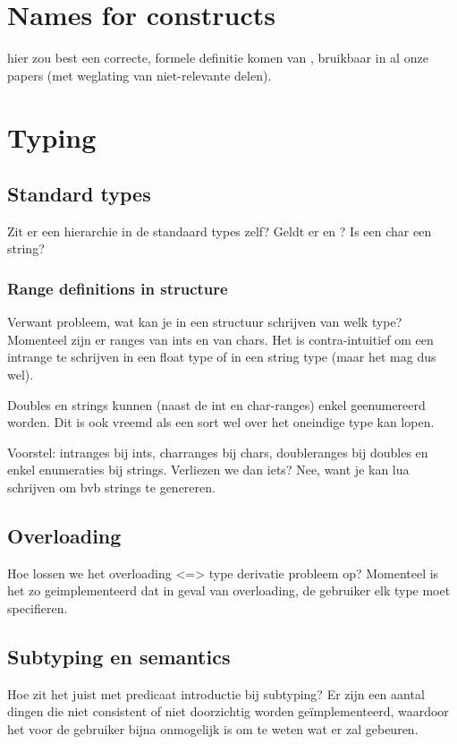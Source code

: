 \documentclass{article}
\begin{document}
\section{Names for \fodot constructs}
hier zou best een correcte, formele definitie komen van \fodot, bruikbaar in al onze papers (met weglating van niet-relevante delen).


\section{Typing}

\subsection{Standard types}
Zit er een hierarchie in de standaard types zelf? Geldt er  en ? Is een char een string?

\subsubsection{Range definitions in structure}
Verwant probleem, wat kan je in een structuur schrijven van welk type? 
Momenteel zijn er ranges van ints en van chars.
Het is contra-intuitief om een intrange te schrijven in een float type of in een string type (maar het mag dus wel).

Doubles en strings kunnen (naast de int en char-ranges) enkel geenumereerd worden. Dit is ook vreemd als een sort wel over het oneindige type kan lopen.

Voorstel:
intranges bij ints, charranges bij chars, doubleranges bij doubles en enkel enumeraties bij strings.
Verliezen we dan iets? Nee, want je kan lua schrijven om bvb strings te genereren. 

\subsection{Overloading}
Hoe lossen we het overloading <=> type derivatie probleem op? Momenteel is het zo geimplementeerd dat in geval van overloading, de gebruiker elk type moet specifieren.

\subsection{Subtyping en semantics}
Hoe zit het juist met predicaat introductie bij subtyping? Er zijn een aantal dingen die niet consistent of niet doorzichtig worden ge\"implementeerd, waardoor het voor de gebruiker bijna onmogelijk is om te weten wat er zal gebeuren.
\end{document}
